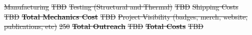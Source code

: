 \documentclass[a4paper,12pt,twoside]{article}
\providecommand{\DIFdeltex}[1]{{\protect\color{red}\sout{#1}}}                      %
\providecommand{\DIFaddbegin}{} %
\providecommand{\DIFdelend}{} %
\providecommand{\DIFdel}[1]{\texorpdfstring{\DIFdeltex{#1}}{}} %
\newcommand{\DIFaddincludegraphics}[2][]{{\color{blue}\fbox{\DIFOincludegraphics[#1]{#2}}}} %
\DeclareRobustCommand{\DIFaddbegin}{\DIFOaddbegin \let\includegraphics\DIFaddincludegraphics} %
\DeclareRobustCommand{\DIFdelend}{\DIFOaddend \let\includegraphics\DIFOincludegraphics} %
\begin{document}
\DIFdel{Manufacturing }%
\DIFdel{TBD }%
\DIFdel{Testing (Structural and Thermal) }%
\DIFdel{TBD }%
\DIFdel{Shipping Costs }%
\DIFdel{TBD }%
\textbf{\DIFdel{Total Mechanics Cost}} %
\DIFdel{TBD }%
\DIFdel{Project Visibility (badges, merch, website, publications, etc)}%
\DIFdel{250}%
\textbf{\DIFdel{Total Outreach}} %
\DIFdel{TBD }%
\textbf{\DIFdel{Total Costs}} %
\DIFdel{TBD }%
\DIFdelend %
\DIFaddbegin 
\end{document}

